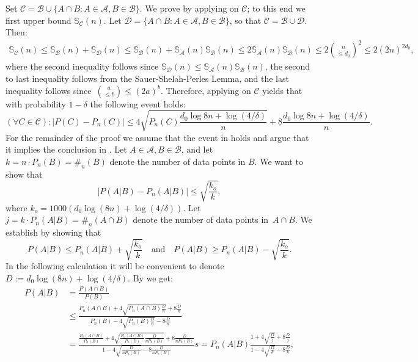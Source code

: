 \documentclass{article}
\def\B{{\mathcal B}}
\newcommand{\cA}{\mathcal{A}}
\newcommand{\cB}{\mathcal{B}}
\newcommand{\cC}{\mathcal{C}}
\begin{document}
Set $\cC = \cB\cup \{A\cap B : A\in\cA, B\in\B\}$. 
We prove  by applying  on $\cC$;
to this end we first upper bound $\mathbb{S}_\cC(n)$.
Let $\mathcal{D}= \{A\cap B :A\in\cA, B\in\cB\}$, so that $\cC = \cB \cup \mathcal{D}$. Then:
\begin{align*}
\mathbb{S}_\cC(n) 
\leq \mathbb{S}_\cB(n) + \mathbb{S}_{\mathcal{D}}(n) \leq \mathbb{S}_\cB(n)  +  \mathbb{S}_\cA(n)\mathbb{S}_\cB(n)\leq 2\mathbb{S}_\cA(n)\mathbb{S}_\cB(n)\leq 2{n \choose \leq d_0}^2\leq 2 (2n)^{2d_0},
\end{align*}
where the second inequality follows since $\mathbb{S}_{\mathcal{D}}(n) \leq \mathbb{S}_\cA(n)\mathbb{S}_\cB(n)$,
the second to last inequality follows from the Sauer-Shelah-Perles Lemma, and the last inequality
follows since~${a \choose \leq b} \leq (2a)^b$.
Therefore, applying  on $\cC$ yields that with probability $1-\delta$ the following event holds:
\begin{equation}\label{eq:BBL}
(\forall C\in \cC): \lvert P(C)- P_n(C) \rvert \leq  4\sqrt{P_n(C)\frac{d_0\log 8n + \log(4/\delta)}{n}} + 8\frac{d_0\log 8n + \log(4/\delta)}{n}. 
\end{equation}
For the remainder of the proof we assume that the event in  holds and argue that it implies
the conclusion in .
Let $A\in\cA, B\in\cB$,  
and let $k=n\cdot P_n(B)=\#_n(B)$ denote the number of data points in $B$. 
We want to show that
\begin{equation}\label{eq:qed}
\left\lvert P(A \vert B) - P_n(A \vert B) \right\rvert \leq 
\sqrt{\frac{k_o}{k}},
\end{equation}
where $k_o=1000 \left(d_0 \log(8n) + \log(4/\delta)\right)$.
Let $j=k\cdot P_n(A\vert B) = \#_n(A\cap B)$ denote the number of data points in~$A\cap B$.
We establish  by showing that 
\[P(A \vert B) \leq  P_n(A\vert B)  + \sqrt{\frac{k_o}{k}}
~~~\text{ and }~~~ P(A \vert B) \geq  P_n(A\vert B)  - \sqrt{\frac{k_o}{k}}.
\]
In the following calculation it will be convenient to denote $D:=d_0 \log(8n) + \log(4/\delta)$. 
By  we get:
\begin{align*}
P(A \vert B) &= \frac{P(A\cap B)}{P(B)}\\
			 &\leq \frac{P_n(A\cap B) + 4\sqrt{P_n(A\cap B)\frac{D}{n}} + 8\frac{D}{n}}{P_n(B) - 4\sqrt{P_n(B)\frac{D}{n}} - 8\frac{D}{n}}\\
			 &=\frac{\frac{P_n(A\cap B)}{P_n(B)} + 4\sqrt{\frac{P_n(A\cap B)}{P_n(B)}\frac{D}{nP_n(B)}} + 8\frac{D}{nP_n(B)}}{1 - 4\sqrt{\frac{D}{nP_n(B)}} - 8\frac{D}{nP_n(B)}}s
			 =P_n(A \vert B)\frac{1+ 4\sqrt{\frac{D}{j}} + 8\frac{D}{j}}{1 - 4\sqrt{\frac{D}{k}} - 8\frac{D}{k}},
\end{align*}
\end{document}
